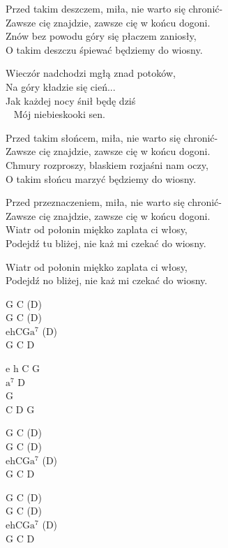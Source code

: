\begin{text}
Przed takim deszczem, miła, nie warto się chronić- \\
Zawsze cię znajdzie, zawsze cię w końcu dogoni.\\
Znów bez powodu góry się płaczem zaniosły,\\
O takim deszczu śpiewać będziemy do wiosny. 

\vin Wieczór nadchodzi mgłą znad potoków,\\
\vin Na góry kładzie się cień...\\
\vin Jak każdej nocy śnił będę dziś\\ 
\vin Mój niebieskooki sen. 

Przed takim słońcem, miła, nie warto się chronić-\\
Zawsze cię znajdzie, zawsze cię w końcu dogoni.\\
Chmury rozproszy, blaskiem rozjaśni nam oczy,\\
O takim słońcu marzyć będziemy do wiosny.

Przed przeznaczeniem, miła, nie warto się chronić-\\
Zawsze cię znajdzie, zawsze cię w końcu dogoni.\\
Wiatr od połonin miękko zaplata ci włosy,\\
Podejdź tu bliżej, nie każ mi czekać do wiosny.

Wiatr od połonin miękko zaplata ci włosy,\\
Podejdź no bliżej, nie każ mi czekać do wiosny.\\
\end{text}
\begin{chord}
G C (D)\\
G C (D)\\
ehCG$\mathrm{a^7}$ (D)\\
G C D

e h C G\\
$\mathrm{a^7}$ D\\
G\\
C D G

G C (D)\\
G C (D)\\
ehCG$\mathrm{a^7}$ (D)\\
G C D

G C (D)\\
G C (D)\\
ehCG$\mathrm{a^7}$ (D)\\
G C D
\end{chord}

